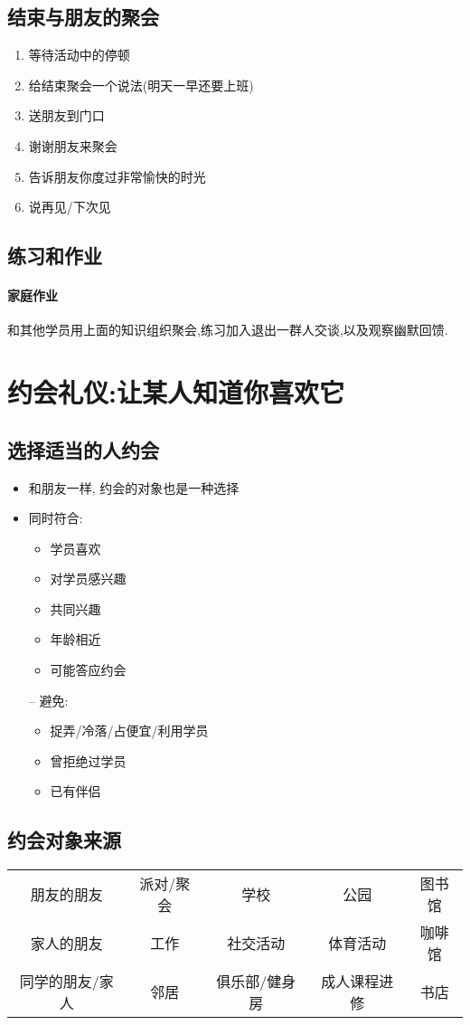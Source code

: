 \documentclass[UTF8]{article}
\newcommand{\Exer}{\subsection{练习和作业}}
\newcommand{\exer}{\paragraph*{家庭作业}}
\newcommand{\dash}{–}
\begin{document}
\subsection{结束与朋友的聚会}
\begin{enumerate}
    \item 等待活动中的停顿
    \item 给结束聚会一个说法(明天一早还要上班)
    \item 送朋友到门口
    \item 谢谢朋友来聚会
    \item 告诉朋友你度过非常愉快的时光
    \item 说再见/下次见
\end{enumerate}
\Exer \exer 和其他学员用上面的知识组织聚会,练习加入退出一群人交谈,以及观察幽默回馈.

\newpage
\section{约会礼仪:让某人知道你喜欢它}
\subsection{选择适当的人约会}
\begin{itemize}
    \item 和朋友一样, 约会的对象也是一种选择
    \item 同时符合:
    \begin{itemize}[label=*]
        \item 学员喜欢
        \item 对学员感兴趣
        \item 共同兴趣
        \item 年龄相近
        \item 可能答应约会
    \end{itemize}
    \item[\dash] 避免:
    \begin{itemize}
        \item 捉弄/冷落/占便宜/利用学员
        \item 曾拒绝过学员
        \item 已有伴侣
    \end{itemize}
\end{itemize}
\subsection{约会对象来源}
\begin{tabular}{|ccccc|}\hline
    朋友的朋友&派对/聚会&学校&公园&图书馆\\ 
    家人的朋友&工作&社交活动&体育活动&咖啡馆\\ 
    同学的朋友/家人&邻居&俱乐部/健身房&成人课程进修&书店\\ \hline
\end{tabular}
\end{document}
